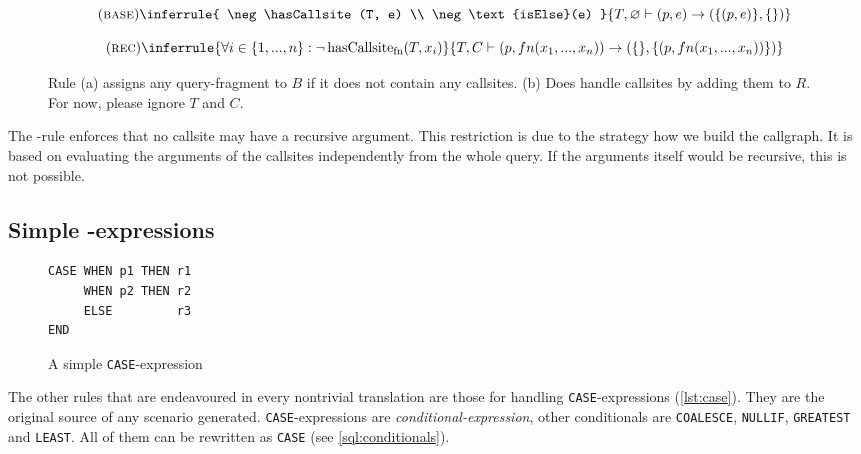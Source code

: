 \begin{figure}[h]\small
    \begin{minipage}[b]{.5\linewidth}
    \centering %
    
  $$
\quad(\textsc{base})\inferrule{
   \neg \hasCallsite(T, e) \\
   \neg \text{isElse}(e)
}{
    T, \varnothing \vdash (p, e) \rightarrow (\{(p, e)\},\{\})
}$$
    \subcaption{}\label{rule:base}
    \end{minipage}\hfill
    \begin{minipage}[b]{.5\linewidth}
    \centering %
$$\quad(\textsc{rec})\inferrule{
   \forall i \in \{1, ..., n\} : \neg \hasCallsite(T, x_i)
}{
    T, C \vdash (p, fn(x_1, ..., x_n)) \rightarrow (\{\}, \{(p, fn(x_1, ..., x_n))\})
}
$$
    \subcaption{}\label{rule:rec}
    \end{minipage}
    \caption{Rule (a) assigns any query-fragment to $B$ if it does not contain any callsites. (b) Does handle callsites by adding them to $R$. For now, please ignore $T$ and $C$.}\label{rule:base_and_rec}
\end{figure}

The \RREC-rule enforces that no callsite may have a recursive argument. This restriction is due to the strategy how we build the callgraph. It is based on evaluating the arguments of the callsites independently from the whole query. If the arguments itself would be recursive, this is not possible.

\subsection{Simple \CASE-expressions}
\begin{wrapfigure}{r}{.3\textwidth}\centering
\begin{verbatim}
CASE WHEN p1 THEN r1
     WHEN p2 THEN r2
     ELSE         r3
END
\end{verbatim}
\caption{A simple \texttt{CASE}-expression}\vspace{-5mm} 
\label{lst:case}
\end{wrapfigure}

The other rules that are endeavoured in every nontrivial translation are those for handling \texttt{CASE}-expressions (\autoref{lst:case}). They are the original source of any scenario generated. \texttt{CASE}-expressions are \textit{conditional-expression}, other conditionals are \texttt{COALESCE}, \texttt{NULLIF}, \texttt{GREATEST} and \texttt{LEAST}. All of them can be rewritten as \texttt{CASE} (see \autoref{sql:conditionals}).

